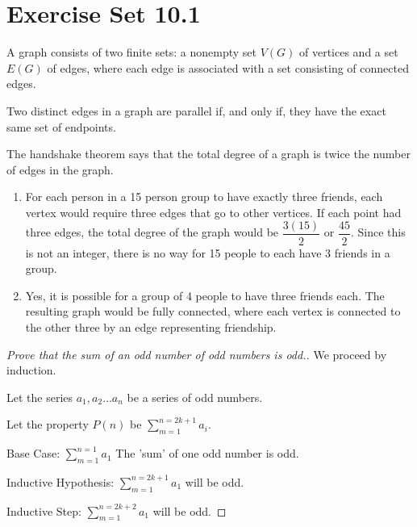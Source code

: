 \documentclass[12pt]{article}
\newenvironment{modenumerate}
  {\enumerate\setupmodenumerate}
  {\endenumerate}
\newif\ifmoditem
\newcommand{\setupmodenumerate}{%
  \global\moditemfalse
  \let\origmakelabel\makelabel
  \def\moditem##1{\global\moditemtrue\def\mesymbol{##1}\item}%
  \def\makelabel##1{%
    \origmakelabel{##1\ifmoditem\rlap{\mesymbol}\fi\enspace}%
    \global\moditemfalse}%
}
\begin{document}

\setcounter{section}{10}
\section*{Exercise Set 10.1} %
\begin{modenumerate}
\item %
  A graph consists of two finite sets: a nonempty set $V(G)$ of vertices and a set $E(G)$ of edges, where each
  edge is associated with a set consisting of connected edges.  \setcounter{enumi}{2}
\item %
Two distinct edges in a graph are parallel if, and only if, they have the exact same set of endpoints.
\setcounter{enumi}{14}
\item %
The handshake theorem says that the total degree of a graph is twice the number of edges in the graph.
\setcounter{enumi}{26}
\moditem{*} %
\begin{enumerate}
\item 
For each person in a 15 person group to have exactly three friends, each vertex would require three edges that
go to other vertices. If each point had three edges, the total degree of the graph would be $\dfrac{3(15)}{2}$
or $\dfrac{45}{2}$. Since this is not an integer, there is no way for 15 people to each have 3 friends in a
group.
\item Yes, it is possible for a group of 4 people to have three friends each. The resulting graph would be
  fully connected, where each vertex is connected to the other three by an edge representing friendship.
\end{enumerate}

\setcounter{enumi}{30}
\item %
\begin{proof}[Prove that the sum of an odd number of odd numbers is odd.]

We proceed by induction.

Let the series $a_{1},a_{2} \dots a_{n}$ be a series of odd numbers.

Let the property $P(n)$ be $\displaystyle\sum_{m=1}^{n=2k+1}a_{i}$.

Base Case: $\displaystyle\sum_{m=1}^{n=1}a_{1}$ The 'sum' of one odd number is odd.

Inductive Hypothesis: $\displaystyle\sum_{m=1}^{n=2k+1}a_{1}$ will be odd.

Inductive Step: $\displaystyle\sum_{m=1}^{n=2k+2}a_{1}$ will be odd.


\end{proof}
\end{modenumerate}
\end{document}
